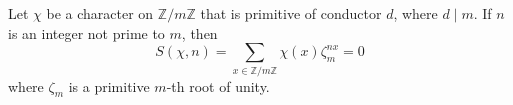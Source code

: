 Let $\chi$ be a character on $\mathbb{Z}/m\mathbb{Z}$ that is primitive of conductor $d$, where $d \mid m$. If $n$ is an integer not prime to $m$, then
$$S(\chi, n) = \sum_{x \in \mathbb{Z}/m\mathbb{Z}} \chi(x) \zeta_m^{nx} = 0$$
where $\zeta_m$ is a primitive $m$-th root of unity.
